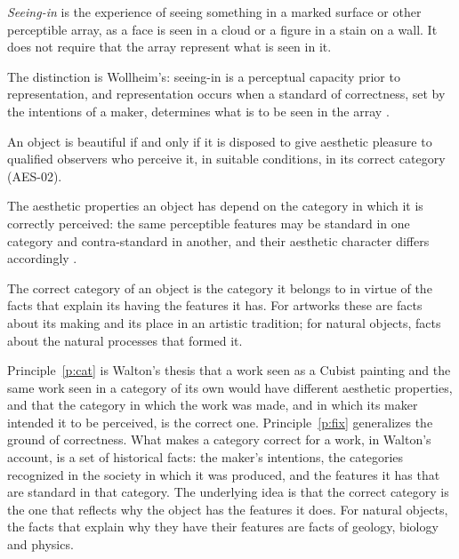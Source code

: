 \documentclass{situationist-preprint}
\begin{document}
\begin{definition}[Seeing-in]\label{d:seein}
\emph{Seeing-in} is the experience of seeing something in a marked surface or other perceptible array, as a face is seen in a cloud or a figure in a stain on a wall. It does not require that the array represent what is seen in it.
\end{definition}

The distinction is Wollheim's: seeing-in is a perceptual capacity prior to representation, and representation occurs when a standard of correctness, set by the intentions of a maker, determines what is to be seen in the array \citep{Wollheim1980}.

\begin{principle}\label{p:rd}
An object is beautiful if and only if it is disposed to give aesthetic pleasure to qualified observers who perceive it, in suitable conditions, in its correct category (AES-02).
\end{principle}

\begin{principle}[Categories]\label{p:cat}
The aesthetic properties an object has depend on the category in which it is correctly perceived: the same perceptible features may be standard in one category and contra-standard in another, and their aesthetic character differs accordingly \citep{Walton1970}.
\end{principle}

\begin{principle}\label{p:fix}
The correct category of an object is the category it belongs to in virtue of the facts that explain its having the features it has. For artworks these are facts about its making and its place in an artistic tradition; for natural objects, facts about the natural processes that formed it.
\end{principle}

Principle~\ref{p:cat} is Walton's thesis that a work seen as a Cubist painting and the same work seen in a category of its own would have different aesthetic properties, and that the category in which the work was made, and in which its maker intended it to be perceived, is the correct one. Principle~\ref{p:fix} generalizes the ground of correctness. What makes a category correct for a work, in Walton's account, is a set of historical facts: the maker's intentions, the categories recognized in the society in which it was produced, and the features it has that are standard in that category. The underlying idea is that the correct category is the one that reflects why the object has the features it does. For natural objects, the facts that explain why they have their features are facts of geology, biology and physics.
\end{document}
